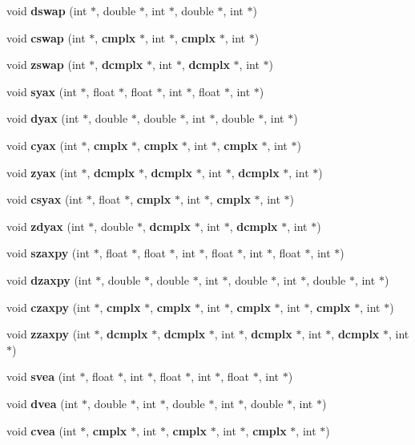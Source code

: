 \begin{CompactItemize}
\item 
void {\bf dswap} (int $\ast$, double $\ast$, int $\ast$, double $\ast$, int $\ast$)
\item 
void {\bf cswap} (int $\ast$, {\bf cmplx} $\ast$, int $\ast$, {\bf cmplx} $\ast$, int $\ast$)
\item 
void {\bf zswap} (int $\ast$, {\bf dcmplx} $\ast$, int $\ast$, {\bf dcmplx} $\ast$, int $\ast$)
\item 
void {\bf syax} (int $\ast$, float $\ast$, float $\ast$, int $\ast$, float $\ast$, int $\ast$)
\item 
void {\bf dyax} (int $\ast$, double $\ast$, double $\ast$, int $\ast$, double $\ast$, int $\ast$)
\item 
void {\bf cyax} (int $\ast$, {\bf cmplx} $\ast$, {\bf cmplx} $\ast$, int $\ast$, {\bf cmplx} $\ast$, int $\ast$)
\item 
void {\bf zyax} (int $\ast$, {\bf dcmplx} $\ast$, {\bf dcmplx} $\ast$, int $\ast$, {\bf dcmplx} $\ast$, int $\ast$)
\item 
void {\bf csyax} (int $\ast$, float $\ast$, {\bf cmplx} $\ast$, int $\ast$, {\bf cmplx} $\ast$, int $\ast$)
\item 
void {\bf zdyax} (int $\ast$, double $\ast$, {\bf dcmplx} $\ast$, int $\ast$, {\bf dcmplx} $\ast$, int $\ast$)
\item 
void {\bf szaxpy} (int $\ast$, float $\ast$, float $\ast$, int $\ast$, float $\ast$, int $\ast$, float $\ast$, int $\ast$)
\item 
void {\bf dzaxpy} (int $\ast$, double $\ast$, double $\ast$, int $\ast$, double $\ast$, int $\ast$, double $\ast$, int $\ast$)
\item 
void {\bf czaxpy} (int $\ast$, {\bf cmplx} $\ast$, {\bf cmplx} $\ast$, int $\ast$, {\bf cmplx} $\ast$, int $\ast$, {\bf cmplx} $\ast$, int $\ast$)
\item 
void {\bf zzaxpy} (int $\ast$, {\bf dcmplx} $\ast$, {\bf dcmplx} $\ast$, int $\ast$, {\bf dcmplx} $\ast$, int $\ast$, {\bf dcmplx} $\ast$, int $\ast$)
\item 
void {\bf svea} (int $\ast$, float $\ast$, int $\ast$, float $\ast$, int $\ast$, float $\ast$, int $\ast$)
\item 
void {\bf dvea} (int $\ast$, double $\ast$, int $\ast$, double $\ast$, int $\ast$, double $\ast$, int $\ast$)
\item 
void {\bf cvea} (int $\ast$, {\bf cmplx} $\ast$, int $\ast$, {\bf cmplx} $\ast$, int $\ast$, {\bf cmplx} $\ast$, int $\ast$)
\item 

\end{CompactItemize}
